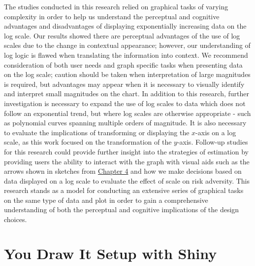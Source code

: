 \documentclass[print]{nuthesis}
\begin{document}
The studies conducted in this research relied on graphical tasks of varying complexity in order to help us understand the perceptual and cognitive advantages and disadvantages of displaying exponentially increasing data on the log scale.
Our results showed there are perceptual advantages of the use of log scales due to the change in contextual appearance; however, our understanding of log logic is flawed when translating the information into context.
We recommend consideration of both user needs and graph specific tasks when presenting data on the log scale; caution should be taken when interpretation of large magnitudes is required, but advantages may appear when it is necessary to visually identify and interpret small magnitudes on the chart.
In addition to this research, further investigation is necessary to expand the use of log scales to data which does not follow an exponential trend, but where log scales are otherwise appropriate - such as polynomial curves spanning multiple orders of magnitude.
It is also necessary to evaluate the implications of transforming or displaying the \(x\)-axis on a log scale, as this work focused on the transformation of the \(y\)-axis.
Follow-up studies for this research could provide further insight into the strategies of estimation by providing users the ability to interact with the graph with visual aids such as the arrows shown in sketches from \protect\hyperlink{estimation}{Chapter 4} and how we make decisions based on data displayed on a log scale to evaluate the effect of scale on risk adversity.
This research stands as a model for conducting an extensive series of graphical tasks on the same type of data and plot in order to gain a comprehensive understanding of both the perceptual and cognitive implications of the design choices.

\appendix

\hypertarget{youdrawit-with-shiny}{%
\chapter{You Draw It Setup with Shiny}\label{youdrawit-with-shiny}}
\end{document}
